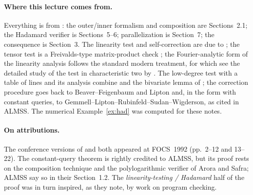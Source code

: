 \paragraph{Where this lecture comes from.}
Everything is from \citet{ALMSS98}: the outer/inner formalism and composition are Sections~2.1; the Hadamard verifier is Sections~5--6; parallelization is Section~7; the  consequence is Section~3.
The linearity test and self-correction are due to \citet{BLR90}; the tensor test is a Freivalds-type matrix-product check \citep{Freivalds79}; the Fourier-analytic form of the linearity analysis follows the standard modern treatment, for which see the detailed study of the test in characteristic two by \citet{BCHKS96}.
The low-degree test with a table of lines and its analysis combine \citet{RubinfeldSudan96} and the bivariate lemma of \citet{AroraSafra98}; the correction procedure goes back to Beaver--Feigenbaum and Lipton and, in the form with constant queries, to Gemmell--Lipton--Rubinfeld--Sudan--Wigderson, as cited in ALMSS.
The numerical Example~\ref{ex:had} was computed for these notes.

\paragraph{On attributions.}
The conference versions of \citet{AroraSafra98} and \citet{ALMSS98} both appeared at FOCS~1992 (pp.~2--12 and 13--22).  The constant-query theorem is rightly credited to ALMSS, but its proof rests on the composition technique and the polylogarithmic verifier of Arora and Safra;
ALMSS say so in their Section~1.2.  The \emph{linearity-testing / Hadamard} half of the proof was in turn inspired, as they note, by work on program checking.

